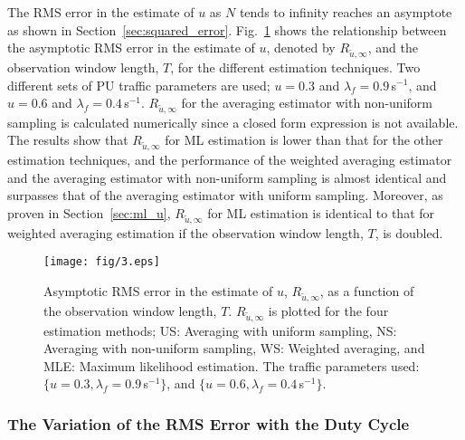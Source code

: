 \documentclass[11pt,draftclsnofoot,journal,onecolumn]{IEEEtran}
\begin{document}
The RMS error in the estimate of $u$ as $N$ tends to infinity reaches an asymptote as shown in Section~\ref{sec:squared_error}. Fig.~\ref{fig:asym_T} shows the relationship between the asymptotic RMS error in the estimate of $u$, denoted by $R_{\tilde{u},\infty}$, and the observation window length, $T$, for the different estimation techniques. Two different sets of PU traffic parameters are used; $u = 0.3$ and $\lambda_f = 0.9$\,s$^{-1}$, and $u = 0.6$ and $\lambda_f = 0.4$\,s$^{-1}$. $R_{\tilde{u},\infty}$ for the averaging estimator with non-uniform sampling is calculated numerically since a closed form expression is not available. The results show that $R_{\tilde{u},\infty}$ for ML estimation is lower than that for the other estimation techniques, and the performance of the weighted averaging estimator and the averaging estimator with non-uniform sampling is almost identical and surpasses that of the averaging estimator with uniform sampling. Moreover, as proven in Section~\ref{sec:ml_u}, $R_{\tilde{u},\infty}$ for ML estimation is identical to that for weighted averaging estimation if the observation window length, $T$, is doubled. 
\begin{figure}
\centering
\texttt{[image: fig/3.eps]}
\caption{Asymptotic RMS error in the estimate of $u$, $R_{\tilde{u},\infty}$, as a function of the observation window length, $T$. $R_{\tilde{u},\infty}$ is plotted for the four estimation methods; US: Averaging with uniform sampling, NS: Averaging with non-uniform sampling, WS: Weighted averaging, and MLE: Maximum likelihood estimation. The traffic parameters used: $\{u = 0.3, \lambda_f = 0.9$\,s$^{-1}\}$, and $\{u = 0.6, \lambda_f = 0.4$\,s$^{-1}\}$.}
\label{fig:asym_T}
\end{figure}

\subsubsection{The Variation of the RMS Error with the Duty Cycle}
\end{document}
